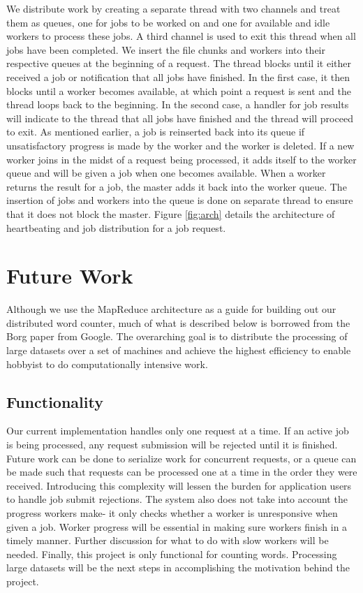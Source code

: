 \documentclass[twoside]{article}
\begin{document}
We distribute work by creating a separate thread with two channels and treat them as queues, one for jobs to be worked on and one for available and idle workers to process these jobs. A third channel is used to exit this thread when all jobs have been completed. We insert the file chunks and workers into their respective queues at the beginning of a request. The thread blocks until it either received a job or notification that all jobs have
finished. In the first case, it then blocks until a worker becomes available, at which point a request is sent and the thread loops back to the beginning. In the second case, a handler for job results will indicate to the thread that all jobs have finished and the thread will proceed to exit. As mentioned earlier, a job is reinserted back into its queue if unsatisfactory progress is made by the worker and the worker is deleted. If a new worker joins in the midst of a request being processed, it adds itself to the worker queue and will
be given a job when one becomes available. When a worker returns the result for a job, the master adds it back into the worker queue. The insertion of jobs and workers into the queue is done on separate thread to ensure that it does not block the master. Figure \ref{fig:arch} details the architecture of heartbeating and job distribution for a job request.


\section{Future Work}
Although we use the MapReduce \cite{mapreduce} architecture as a guide for building out our distributed word counter, much of what is described below is borrowed from the Borg \cite{borg} paper from Google. The overarching goal is to distribute the processing of large datasets over a set of machines and achieve the highest efficiency to enable hobbyist to do computationally intensive work.
\subsection{Functionality}
Our current implementation handles only one request at a time. If an active job is being processed, any request submission will be rejected until it is finished. Future work can be done to serialize work for concurrent requests, or a queue can be made such that requests can be processed one at a time in the order they were received. Introducing this complexity will lessen the burden for application users to handle job submit rejections. 
The system also does not take into account the progress workers make- it only checks whether a worker is unresponsive when given a job. Worker progress will be essential in making sure workers finish in a timely manner. Further discussion for what to do with slow workers will be needed.
Finally, this project is only functional for counting words. Processing large datasets will be the next steps in accomplishing the motivation behind the project. 
\end{document}
